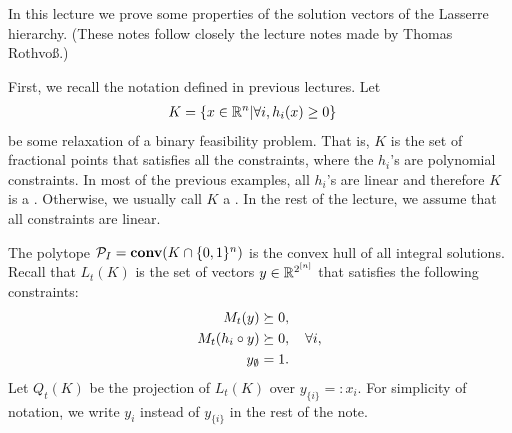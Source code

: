 \documentclass[a4paper,twoside,justified]{tufte-handout}
\begin{document}
 

In this lecture we prove some properties of the solution vectors of
the Lasserre hierarchy. (These notes follow closely the lecture notes made by Thomas Rothvo{\ss}\cite{lasserresurvey2013}.)

First, we recall the notation defined in previous lectures.
Let
\begin{alignat}{2}
  K &= \left\{ x \in \mathbb{R}^n | \forall i, h_i(x) \ge 0 \right\} \label{eq:setK}
\end{alignat}
be some relaxation of a binary feasibility problem.
That is, $K$ is the set of fractional points that satisfies all the constraints,
where the $h_i$'s are polynomial constraints. In most of the previous
examples, all $h_i$'s are linear and therefore $K$ is a .
Otherwise, we usually call $K$ a .
In the rest of the lecture, we assume that all constraints are linear.

The polytope $\mathcal{P}_{I}=\mathbf{conv}(K \cap \{0,1\}^n)$ is the convex hull of
all integral solutions. Recall that 
$L_t(K)$ is the set of vectors $y \in \mathbb{R}^{2^{[n]}}$
that satisfies the following constraints:
\begin{alignat}{2}
  M_t(y) & \succeq 0,  \notag \\
  M_t(h_i \circ y) & \succeq 0, \quad \forall i, \label{eq:lasserre-definition} \\
  y_{\emptyset} &= 1 \notag.
\end{alignat}
Let $Q_t(K)$ be the projection of $L_t(K)$ over $y_{\{i\}}=:x_i$.
For simplicity of notation, we 
write $y_i$ instead of $y_{\{i\}}$ in the rest of the note.
\end{document}

